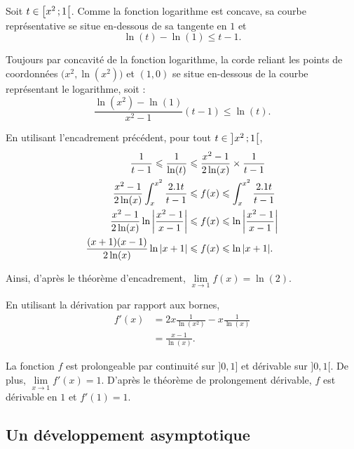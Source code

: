 \begin{elemsolution}
\begin{reponses}
\item Soit $t \in \left[x^2\,;1\right[$. Comme la fonction logarithme est concave, sa courbe représentative se situe en-dessous de sa tangente en $1$ et
\[
\ln(t) - \ln(1) \leqslant t - 1.
\]

\medskip

Toujours par concavité de la fonction logarithme, la corde reliant les points de coordonnées $\big(x^2, \ln(x^2)\big)$ et $(1, 0)$ se situe en-dessous de la courbe représentant le logarithme, soit :
\[
\frac{\ln(x^2) - \ln(1)}{x^2 - 1} (t - 1) \leqslant \ln(t).
\]

\item En utilisant l'encadrement précédent, pour tout $t \in \left]x^2\,;1\right[$,
\begin{align*}
\frac{1}{t - 1} \leqslant \frac{1}{\ln(t)} &\leqslant \frac{x^2 - 1}{2 \ln(x)} \times \frac{1}{t - 1}\\
\frac{x^2 - 1}{2 \ln(x)} \int_x^{x^2} \frac{2.1 t}{t - 1} &\leqslant f(x) \leqslant \int_x^{x^2} \frac{2.1 t}{t - 1}\\
\frac{x^2 - 1}{2 \ln(x)} \ln \abs{\frac{x^2 - 1}{x - 1}} &\leqslant f(x) \leqslant \ln\abs{\frac{x^2 - 1}{x - 1}}\\
\frac{(x + 1) (x - 1)}{2 \ln(x)} \ln\abs{x + 1} &\leqslant f(x) \leqslant \ln\abs{x + 1}.
\end{align*}

Ainsi, d'après le théorème d'encadrement, $\lim\limits_{x\to 1} f(x) = \ln(2)$.

\item En utilisant la dérivation par rapport aux bornes,
\begin{align*}
f'(x)
&= 2 x \frac{1}{\ln(x^2)} - x \frac{1}{\ln(x)}\\
&= \frac{x - 1}{\ln(x)}.
\end{align*}

La fonction $f$ est prolongeable par continuité sur $]0, 1]$ et dérivable sur $]0, 1[$. De plus, $\lim\limits_{x\to 1} f'(x) = 1$. D'après le théorème de prolongement dérivable, $f$ est dérivable en $1$ et $f'(1) = 1$.
\end{reponses}
\end{elemsolution}

\subsection{Un développement asymptotique}

